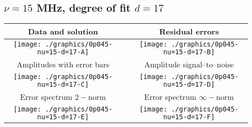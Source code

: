 

% 

\clearpage{}
\break{}

\subsection{$\nu = 15$ MHz, degree of fit $d = 17$}

\begin{table}[h]
    \begin{center}
        \begin{tabular}{ccc}
            Data and solution & \quad & Residual errors \\\hline
            \texttt{[image: ./graphics/0p045-nu=15-d=17-A]} &&
            \texttt{[image: ./graphics/0p045-nu=15-d=17-B]} \\[15pt]
            Amplitudes with error bars && Amplitude signal--to--noise \\\hline
            \texttt{[image: ./graphics/0p045-nu=15-d=17-C]} &&
            \texttt{[image: ./graphics/0p045-nu=15-d=17-D]} \\[15pt]
            Error spectrum $2-$norm && Error spectrum $\infty-$norm \\\hline
            \texttt{[image: ./graphics/0p045-nu=15-d=17-E]} &&
            \texttt{[image: ./graphics/0p045-nu=15-d=17-F]} \\[15pt]
        \end{tabular}
    \end{center}
\label{fig:elev=45, nu=15}
\end{table}



\endinput
